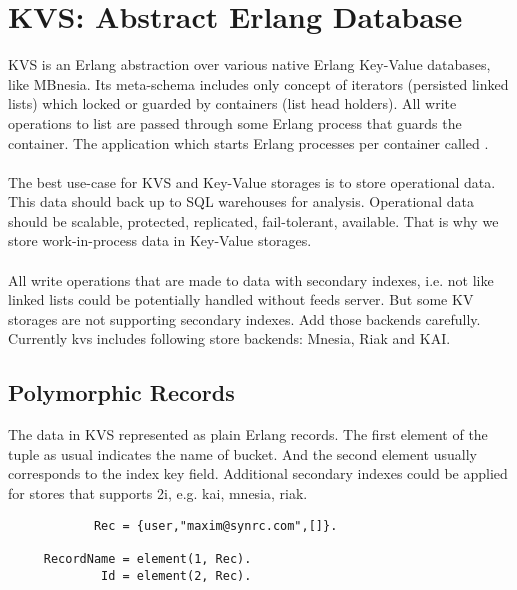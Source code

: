 \section{KVS: Abstract Erlang Database}

KVS is an Erlang abstraction over various native Erlang Key-Value databases,
like MBnesia. Its meta-schema includes only concept
of iterators (persisted linked lists) which locked or guarded by
containers (list head holders). All write operations to list are
passed through some Erlang process that guards the container. The application
which starts Erlang processes per container called .

\paragraph{}
The best use-case for KVS and Key-Value storages is to store operational data.
This data should back up to SQL warehouses for analysis. Operational data
should be scalable, protected, replicated, fail-tolerant, available. That is why
we store work-in-process data in Key-Value storages.

\paragraph{}
All write operations that are made to data with secondary indexes,
i.e. not like linked lists could be potentially handled without
feeds server. But some KV storages are not supporting secondary
indexes. Add those backends carefully. Currently kvs includes
following store backends: Mnesia, Riak and KAI.

\subsection{Polymorphic Records}

The data in KVS represented as plain Erlang records.
The first element of the tuple as usual indicates the name of bucket.
And the second element usually corresponds to the index key field.
Additional secondary indexes could be applied for stores that
supports 2i, e.g. kai, mnesia, riak.

\begin{lstlisting}
            Rec = {user,"maxim@synrc.com",[]}.

     RecordName = element(1, Rec).
             Id = element(2, Rec).
\end{lstlisting}

